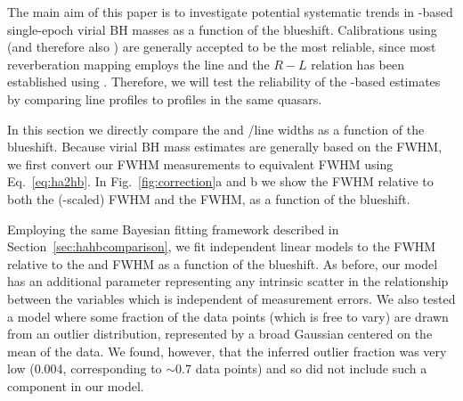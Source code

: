The main aim of this paper is to investigate potential systematic trends in -based single-epoch virial BH masses as a function of the  blueshift. 
Calibrations using \hb (and therefore also \hans) are generally accepted to be the most reliable, since most reverberation mapping employs the \hb line and the $R-L$ relation has been established using \hbns.
Therefore, we will test the reliability of the -based estimates by comparing  line profiles to \ha profiles in the same quasars. 

In this section we directly compare the  and \hans/\hb line widths as a function of the  blueshift. 
Because virial BH mass estimates are generally based on the \hb FWHM, we first convert our \ha FWHM measurements to equivalent \hb FWHM using Eq.~\ref{eq:ha2hb}.  
In Fig.~\ref{fig:correction}a and b we show the  FWHM relative to both the (\hbns-scaled) \ha FWHM and the \hb FWHM, as a function of the  blueshift. 

Employing the same Bayesian fitting framework described in Section~\ref{sec:hahbcomparison}, we fit independent linear models to the  FWHM relative to the \ha and \hb FWHM as a function of the  blueshift. 
As before, our model has an additional parameter representing any intrinsic scatter in the relationship between the variables which is independent of measurement errors.  
We also tested a model where some fraction of the data points (which is free to vary) are drawn from an outlier distribution, represented by a broad Gaussian centered on the mean of the data. 
We found, however, that the inferred outlier fraction was very low (0.004, corresponding to $\sim$0.7 data points) and so did not include such a component in our model. 

